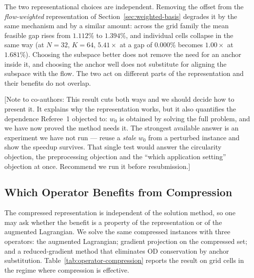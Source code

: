 \documentclass[11pt]{article}
\newcommand{\conote}[1]{{\color{red}\small\textsf{[Note to co-authors: #1]}}}
\begin{document}
The two representational choices are independent. Removing the offset from the
\emph{flow-weighted} representation of Section~\ref{sec:weighted-basis} degrades it by the same
mechanism and by a similar amount: across the grid family the mean feasible gap rises from
$1.112\%$ to $1.394\%$, and individual cells collapse in the same way (at $N=32$, $K=64$,
$5.41\times$ at a gap of $0.000\%$ becomes $1.00\times$ at $1.681\%$). Choosing the subspace
better does not remove the need for an anchor inside it, and choosing the anchor well does not
substitute for aligning the subspace with the flow. The two act on different parts of the
representation and their benefits do not overlap.

\conote{This result cuts both ways and we should decide how to present it. It explains why the
representation works, but it also quantifies the dependence Referee~1 objected to: $w_0$ is
obtained by solving the full problem, and we have now proved the method needs it. The
strongest available answer is an experiment we have not run --- reuse a \emph{stale} $w_0$
from a perturbed instance and show the speedup survives. That single test would answer the
circularity objection, the preprocessing objection and the ``which application setting''
objection at once. Recommend we run it before resubmission.}


\subsection{Which Operator Benefits from Compression}
\label{sec:operator-study}


The compressed representation is independent of the solution method, so one may ask whether
the benefit is a property of the representation or of the augmented Lagrangian. We solve the
same compressed instances with three operators: the augmented Lagrangian; gradient projection
on the compressed set; and a reduced-gradient method that eliminates OD conservation by
anchor substitution. Table~\ref{tab:operator-compression} reports the result on grid cells in
the regime where compression is effective.
\end{document}
